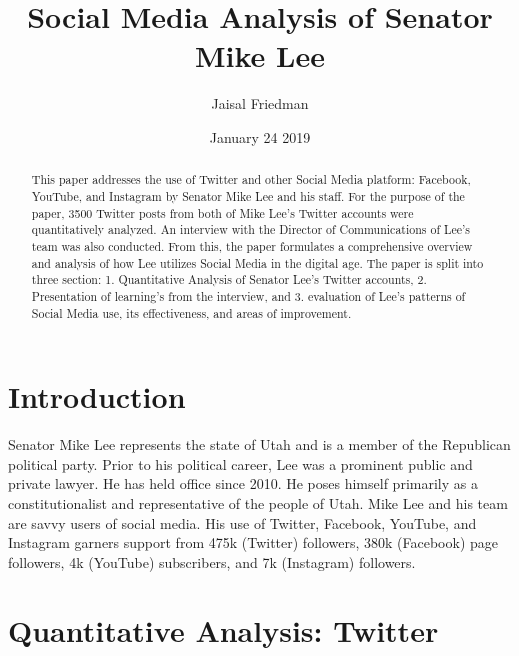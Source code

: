 \documentclass{article}
\title{Social Media Analysis of Senator Mike Lee}
\author{Jaisal Friedman}
\date{January 24 2019}
\begin{document}
\maketitle


\begin{abstract}
    This paper addresses the use of Twitter and other Social Media platform: Facebook, YouTube, and Instagram by Senator Mike Lee and his staff. For the purpose of the paper, 3500 Twitter posts from both of Mike Lee's Twitter accounts were quantitatively analyzed. An interview with the Director of Communications of Lee's team was also conducted. From this, the paper formulates a comprehensive overview and analysis of how Lee utilizes Social Media in the digital age. The paper is split into three section: 1. Quantitative Analysis of Senator Lee's Twitter accounts, 2. Presentation of learning's from the interview, and 3. evaluation of Lee's patterns of Social Media use, its effectiveness, and areas of improvement.  
\end{abstract} \newpage
\section{Introduction}
    Senator Mike Lee represents the state of Utah and is a member of the Republican political party. Prior to his political career, Lee was a prominent public and private lawyer. He has held office since 2010. He poses himself primarily as a constitutionalist and representative of the people of Utah. Mike Lee and his team are savvy users of social media. His use of Twitter, Facebook, YouTube, and Instagram garners support from 475k (Twitter) followers, 380k (Facebook) page followers, 4k (YouTube) subscribers, and 7k (Instagram) followers.

\section{Quantitative Analysis: Twitter}
\end{document}
